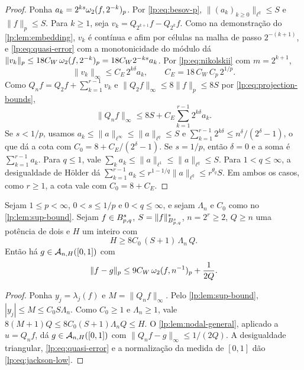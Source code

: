 \documentclass[12pt,a4paper]{article}
\begin{document}
\begin{proof}
Ponha $a_k=2^{ks}\omega_2(f,2^{-k})_{p}$. Por \eqref{lp:eq:besov-p}, $\|(a_k)_{k\ge0}\|_{\ell^q}\le S$ e $\|f\|_p\le S$. Para $k\ge1$, seja $v_k=Q_{2^{k+1}}f-Q_{2^k}f$. Como na demonstração do \cref{lp:lem:embedding}, $v_k$ é contínua e afim por células na malha de passo $2^{-(k+1)}$, e \eqref{lp:eq:quasi-error} com a monotonicidade do módulo dá $\|v_k\|_p\le18C_W\,\omega_2(f,2^{-k})_{p}=18C_W2^{-ks}a_k$. Por \eqref{lp:eq:nikolskii} com $m=2^{k+1}$,
\[
 \|v_k\|_\infty\le C_E\,2^{k\delta}a_k,\qquad C_E=18\,C_W\,C_p\,2^{1/p}.
\]
Como $Q_nf=Q_2f+\sum_{k=1}^{r-1}v_k$ e $\|Q_2f\|_\infty\le8\|f\|_p\le8S$ por \eqref{lp:eq:projection-bounds},
\[
 \|Q_nf\|_\infty\le8S+C_E\sum_{k=1}^{r-1}2^{k\delta}a_k .
\]
Se $s<1/p$, usamos $a_k\le\|a\|_{\ell^\infty}\le\|a\|_{\ell^q}\le S$ e $\sum_{k=1}^{r-1}2^{k\delta}\le n^\delta/(2^\delta-1)$, o que dá a cota com $C_0=8+C_E/(2^\delta-1)$. Se $s=1/p$, então $\delta=0$ e a soma é $\sum_{k=1}^{r-1}a_k$. Para $q\le1$, vale $\sum_ka_k\le\|a\|_{\ell^1}\le\|a\|_{\ell^q}\le S$. Para $1<q\le\infty$, a desigualdade de Hölder dá $\sum_{k=1}^{r-1}a_k\le r^{1-1/q}\|a\|_{\ell^q}\le r^{\theta_q}S$. Em ambos os casos, como $r\ge1$, a cota vale com $C_0=8+C_E$.
\end{proof}

\begin{teorema}
\label{lp:thm:jackson-low}
Sejam $1\le p<\infty$, $0<s\le1/p$ e $0<q\le\infty$, e sejam $\Lambda_n$ e $C_0$ como no \cref{lp:lem:sup-bound}. Sejam $f\in B^{s}_{p,q}$, $S=\|f\|^*_{B^{s}_{p,q}}$, $n=2^r\ge2$, $Q\ge n$ uma potência de dois e $H$ um inteiro com
\begin{equation}
 H\ge8C_0\,(S+1)\,\Lambda_n\,Q.
 \label{lp:eq:height-low}
\end{equation}
Então há $g\in\mathcal A_{n,H}([0,1])$ com
\begin{equation}
 \|f-g\|_p\le9C_W\,\omega_2(f,n^{-1})_{p}+\frac1{2Q}.
 \label{lp:eq:jackson-low}
\end{equation}
\end{teorema}

\begin{proof}
Ponha $y_j=\lambda_j(f)$ e $M=\|Q_nf\|_\infty$. Pelo \cref{lp:lem:sup-bound}, $|y_j|\le M\le C_0S\Lambda_n$. Como $C_0\ge1$ e $\Lambda_n\ge1$, vale $8(M+1)Q\le8C_0(S+1)\Lambda_nQ\le H$. O \cref{lp:lem:nodal-general}, aplicado a $u=Q_nf$, dá $g\in\mathcal A_{n,H}([0,1])$ com $\|Q_nf-g\|_\infty\le1/(2Q)$. A desigualdade triangular, \eqref{lp:eq:quasi-error} e a normalização da medida de $[0,1]$ dão \eqref{lp:eq:jackson-low}.
\end{proof}
\end{document}
